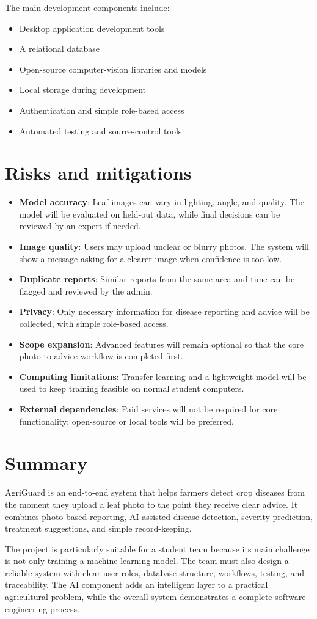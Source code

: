 \documentclass[11pt,a4paper]{article}
\begin{document}
The main development components include:
\begin{itemize}[leftmargin=*]
    \item Desktop application development tools
    \item A relational database
    \item Open-source computer-vision libraries and models
    \item Local storage during development
    \item Authentication and simple role-based access
    \item Automated testing and source-control tools
\end{itemize}




\section{Risks and mitigations}
\begin{itemize}[leftmargin=*]
    \item \textbf{Model accuracy}: Leaf images can vary in lighting, angle, and quality. The model will be evaluated on held-out data, while final decisions can be reviewed by an expert if needed.
    \item \textbf{Image quality}: Users may upload unclear or blurry photos. The system will show a message asking for a clearer image when confidence is too low.
    \item \textbf{Duplicate reports}: Similar reports from the same area and time can be flagged and reviewed by the admin.
    \item \textbf{Privacy}: Only necessary information for disease reporting and advice will be collected, with simple role-based access.
    \item \textbf{Scope expansion}: Advanced features will remain optional so that the core photo-to-advice workflow is completed first.
    \item \textbf{Computing limitations}: Transfer learning and a lightweight model will be used to keep training feasible on normal student computers.
    \item \textbf{External dependencies}: Paid services will not be required for core functionality; open-source or local tools will be preferred.
\end{itemize}

\section{Summary}
AgriGuard is an end-to-end system that helps farmers detect crop diseases from the moment they upload a leaf photo to the point they receive clear advice. It combines photo-based reporting, AI-assisted disease detection, severity prediction, treatment suggestions, and simple record-keeping.

The project is particularly suitable for a student team because its main challenge is not only training a machine-learning model. The team must also design a reliable system with clear user roles, database structure, workflows, testing, and traceability. The AI component adds an intelligent layer to a practical agricultural problem, while the overall system demonstrates a complete software engineering process.
\end{document}
